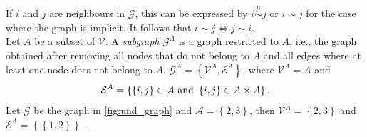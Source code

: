 If $i$ and $j$ are neighbours in $\mathcal{G}$, this can be expressed by $i\overset{\mathcal{G}}{\sim}j$ or $i\sim j$ for the case where the graph is implicit. It follows that $i\sim j\Longleftrightarrow j\sim i$. \\
Let $A$ be a subset of $\mathcal{V}$. A \textit{subgraph} $\mathcal{G}^A$ is a graph restricted to $A$, i.e., the graph obtained after removing all nodes that do not belong to $A$ and all edges where at least one node does not belong to $A$. $\mathcal{G}^A=\left\lbrace\mathcal{V}^A,\mathcal{E}^A\right\rbrace$, where $\mathcal{V}^A=A$ and 
\begin{equation*}
    \mathcal{E}^A = \left\lbrace\left\lbrace i,j\right\rbrace\in\mathcal{A} \hbox{ and } \left\lbrace i,j\right\rbrace\in A\times A\right\rbrace.
\end{equation*}
Let $\mathcal{G}$ be the graph in \autoref{fig:und_graph} and $\mathcal{A}=\left\lbrace2,3\right\rbrace$, then $\mathcal{V}^A=\left\lbrace2,3\right\rbrace$ and $\mathcal{E}^A=\left\lbrace\left\lbrace 1,2\right\rbrace\right\rbrace$ \autocite[][17--18]{rue2005gaussian}.

